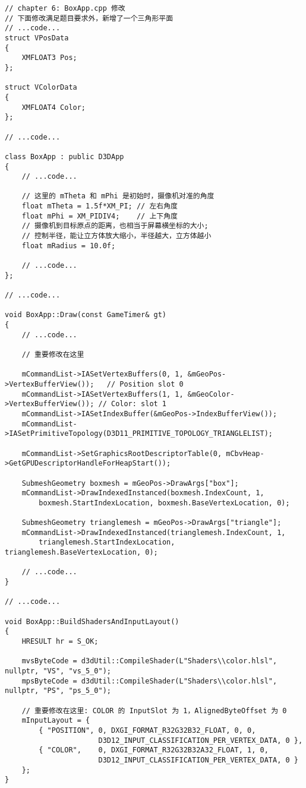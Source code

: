 \begin{lstlisting}
// chapter 6: BoxApp.cpp 修改
// 下面修改满足题目要求外，新增了一个三角形平面
// ...code...
struct VPosData
{
    XMFLOAT3 Pos;
};

struct VColorData
{
    XMFLOAT4 Color;
};

// ...code...

class BoxApp : public D3DApp
{
    // ...code...

    // 这里的 mTheta 和 mPhi 是初始时，摄像机对准的角度
    float mTheta = 1.5f*XM_PI; // 左右角度
    float mPhi = XM_PIDIV4;    // 上下角度
    // 摄像机到目标原点的距离，也相当于屏幕横坐标的大小;
    // 控制半径，能让立方体放大缩小，半径越大，立方体越小
    float mRadius = 10.0f;

    // ...code...
};

// ...code...

void BoxApp::Draw(const GameTimer& gt)
{
    // ...code...
    
    // 重要修改在这里

    mCommandList->IASetVertexBuffers(0, 1, &mGeoPos->VertexBufferView());   // Position slot 0
    mCommandList->IASetVertexBuffers(1, 1, &mGeoColor->VertexBufferView()); // Color: slot 1
    mCommandList->IASetIndexBuffer(&mGeoPos->IndexBufferView());
    mCommandList->IASetPrimitiveTopology(D3D11_PRIMITIVE_TOPOLOGY_TRIANGLELIST);

    mCommandList->SetGraphicsRootDescriptorTable(0, mCbvHeap->GetGPUDescriptorHandleForHeapStart());

    SubmeshGeometry boxmesh = mGeoPos->DrawArgs["box"];
    mCommandList->DrawIndexedInstanced(boxmesh.IndexCount, 1,
        boxmesh.StartIndexLocation, boxmesh.BaseVertexLocation, 0);

    SubmeshGeometry trianglemesh = mGeoPos->DrawArgs["triangle"];
    mCommandList->DrawIndexedInstanced(trianglemesh.IndexCount, 1, 
        trianglemesh.StartIndexLocation, trianglemesh.BaseVertexLocation, 0);

    // ...code...
}

// ...code...

void BoxApp::BuildShadersAndInputLayout()
{
    HRESULT hr = S_OK;

    mvsByteCode = d3dUtil::CompileShader(L"Shaders\\color.hlsl", nullptr, "VS", "vs_5_0");
    mpsByteCode = d3dUtil::CompileShader(L"Shaders\\color.hlsl", nullptr, "PS", "ps_5_0");

    // 重要修改在这里: COLOR 的 InputSlot 为 1，AlignedByteOffset 为 0
    mInputLayout = {
        { "POSITION", 0, DXGI_FORMAT_R32G32B32_FLOAT, 0, 0, 
                      D3D12_INPUT_CLASSIFICATION_PER_VERTEX_DATA, 0 },
        { "COLOR",    0, DXGI_FORMAT_R32G32B32A32_FLOAT, 1, 0, 
                      D3D12_INPUT_CLASSIFICATION_PER_VERTEX_DATA, 0 }
    };
}


\end{lstlisting}
